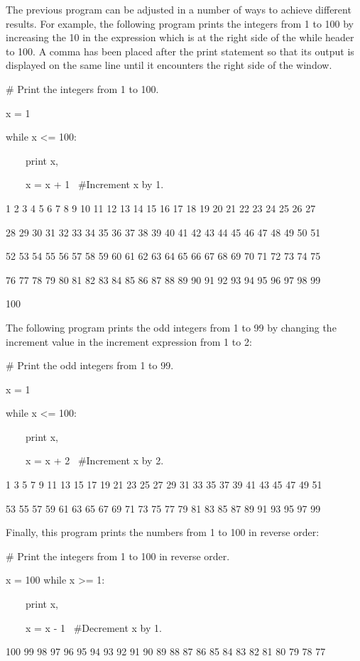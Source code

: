 \documentclass[12pt,oneside]{book}
\begin{document}
The previous program can be adjusted in a number of ways to achieve different results. For example, the following program prints the integers from 1 to 100 by increasing the 10 in the expression which is at the right side of the while header to 100. A comma has been placed after the print statement so that its output is displayed on the same line until it encounters the right side of the window. 

\# Print the integers from 1 to 100.


x = 1 


while x {\textless}= 100:

\ \ \ \ print x,

\ \ \ \ x = x + 1 \ \#Increment x by 1.

{\textbar}

1 2 3 4 5 6 7 8 9 10 11 12 13 14 15 16 17 18 19 20 21 22 23 24 25 26 27

28 29 30 31 32 33 34 35 36 37 38 39 40 41 42 43 44 45 46 47 48 49 50 51

52 53 54 55 56 57 58 59 60 61 62 63 64 65 66 67 68 69 70 71 72 73 74 75

76 77 78 79 80 81 82 83 84 85 86 87 88 89 90 91 92 93 94 95 96 97 98 99

100 

The following program prints the odd integers from 1 to 99 by changing the increment value in the increment expression from 1 to 2: 

\# Print the odd integers from 1 to 99.


x = 1 


while x {\textless}= 100:

\ \ \ \ print x,

\ \ \ \ x = x + 2 \ \#Increment x by 2.

{\textbar}

1 3 5 7 9 11 13 15 17 19 21 23 25 27 29 31 33 35 37 39 41 43 45 47 49 51

53 55 57 59 61 63 65 67 69 71 73 75 77 79 81 83 85 87 89 91 93 95 97 99 

Finally, this program prints the numbers from 1 to 100 in reverse order:


\# Print the integers from 1 to 100 in reverse order.


x = 100 
while x {\textgreater}= 1:

\ \ \ \ print x,

\ \ \ \ x = x {}- 1 \ \#Decrement x by 1.

{\textbar}

100 99 98 97 96 95 94 93 92 91 90 89 88 87 86 85 84 83 82 81 80 79 78 77
\end{document}
